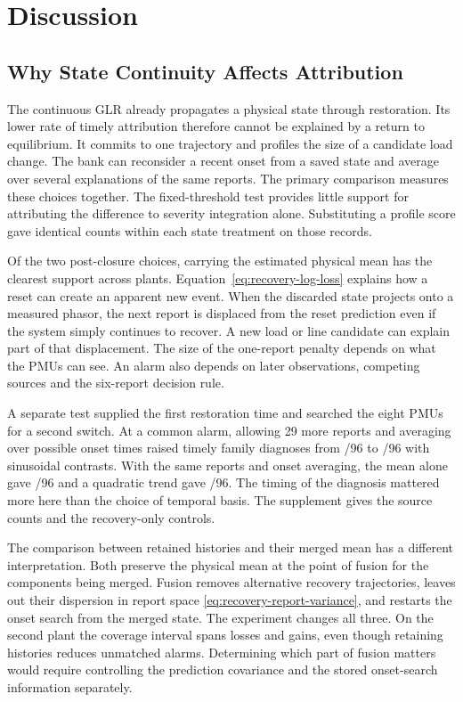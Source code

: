\section{Discussion}
\label{sec:discussion}

\subsection{Why State Continuity Affects Attribution}

The continuous GLR already propagates a physical state through
restoration. Its lower rate of timely attribution therefore cannot be
explained by a return to equilibrium. It commits to one trajectory and
profiles the size of a candidate load change. The bank can reconsider a
recent onset from a saved state and average over several explanations of
the same reports. The primary comparison measures these choices together.
The fixed-threshold test provides little support for attributing the
difference to severity integration alone. Substituting a profile score
gave identical counts within each state treatment on those records.

Of the two post-closure choices, carrying the estimated physical mean
has the clearest support across plants. Equation~\eqref{eq:recovery-log-loss}
explains how a reset can create an apparent new event. When the discarded
state projects onto a measured phasor, the next report is displaced from
the reset prediction even if the system simply continues to recover.
A new load or line candidate can explain part of that displacement.
The size of the one-report penalty depends on what the PMUs can see.
An alarm also depends on later observations, competing sources and the
six-report decision rule.

A separate test supplied the first restoration time and searched the
eight PMUs for a second switch. At a common alarm, allowing 29 more
reports and averaging over possible onset times raised timely family
diagnoses from \ModalImmediateFamily{}/96 to \ModalConfirmFamily{}/96
with sinusoidal contrasts. With the same reports and onset averaging,
the mean alone gave \ModalConfirmMean{}/96 and a quadratic trend gave
\ModalConfirmQuad{}/96. The timing of the diagnosis mattered more here
than the choice of temporal basis. The supplement gives the source
counts and the recovery-only controls.

The comparison between retained histories and their merged mean has a
different interpretation. Both preserve the physical mean at the point
of fusion for the components being merged. Fusion removes alternative
recovery trajectories, leaves out their dispersion in report space
\eqref{eq:recovery-report-variance}, and restarts the onset search from
the merged state. The experiment changes all three. On the second plant
the coverage interval spans losses and gains, even though retaining
histories reduces unmatched alarms. Determining which part of fusion
matters would require controlling the prediction covariance and the
stored onset-search information separately.

